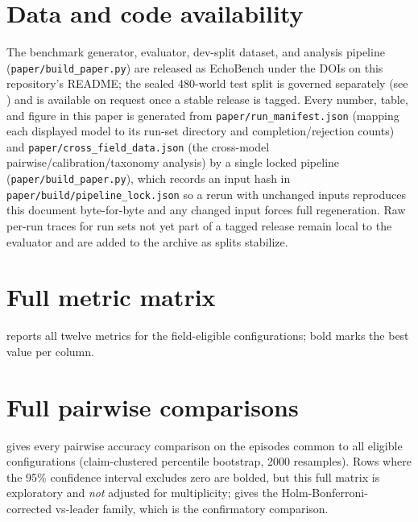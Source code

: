 \documentclass{article}
\begin{document}
\section*{Data and code availability}

The benchmark generator, evaluator, dev-split dataset, and analysis pipeline
(\texttt{paper/build\_paper.py}) are released as EchoBench under the DOIs on this
repository's README; the sealed 480-world test split is governed separately (see
) and is available on request once a stable release is tagged. Every
number, table, and figure in this paper is generated from
\texttt{paper/run\_manifest.json} (mapping each displayed model to its run-set
directory and completion/rejection counts) and \texttt{paper/cross\_field\_data.json}
(the cross-model pairwise/calibration/taxonomy analysis) by a single locked pipeline
(\texttt{paper/build\_paper.py}), which records an input hash in
\texttt{paper/build/pipeline\_lock.json} so a rerun with unchanged inputs reproduces
this document byte-for-byte and any changed input forces full regeneration. Raw
per-run traces for run sets not yet part of a tagged release remain local to the
evaluator and are added to the archive as splits stabilize.






\appendix

\section{Full metric matrix}
\label{app:matrix}

 reports all twelve metrics for the \FieldSize{} field-eligible
configurations; bold marks the best value per column.

\begin{table}[H]
\centering
\footnotesize
\caption{All metrics, dev-split pilots. SER, PSR, TUA added to the headline set.}
\label{tab:full-matrix}
\resizebox{\linewidth}{!}{}
\end{table}


\section{Full pairwise comparisons}
\label{app:pairwise}

 gives every pairwise accuracy comparison on the
\CommonEpisodes{} episodes common to all \FieldSize{} eligible configurations
(claim-clustered percentile bootstrap, 2000 resamples). Rows where the 95\%
confidence interval excludes zero are bolded, but this full matrix is exploratory
and \emph{not} adjusted for multiplicity;  gives the
Holm-Bonferroni-corrected vs-leader family, which is the confirmatory comparison.
\end{document}
